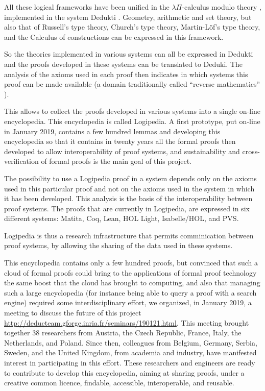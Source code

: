 All these logical frameworks have been unified in the $\lambda
\Pi$-calculus modulo theory \cite{CousineauDowek07}, implemented in
the system {\sc Dedukti} \cite{Assaf16}.  Geometry, arithmetic and set
theory, but also that of Russell's type theory, Church's type theory,
Martin-L\"of's type theory, and the Calculus of constructions can be
expressed in this framework.

So the theories implemented in various systems can all be expressed in
{\sc Dedukti} and the proofs developed in these systems can be
translated to {\sc Deduki}.  The analysis of the axioms used in each
proof then indicates in which systems this proof can be made available
\cite{Thire18,Dowek17} (a domain traditionally called ``reverse
mathematics'' \cite{Friedman76,Simpson09}).

This allows to collect the proofs developed in various systems into a
single on-line encyclopedia.  This encyclopedia is called {\sc
  Logipedia}. A first prototype, put on-line in January 2019, contains
a few hundred lemmas and developing this encyclopedia so that it
contains in twenty years all the formal proofs then developed to allow
interoperability of proof systems, and sustainability and
cross-verification of formal proofs is the main goal of this project.

The possibility to use a {\sc Logipedia} proof in a system depends
only on the axioms used in this particular proof and not on the axioms
used in the system in which it has been developed. This analysis is
the basis of the interoperability between proof systems.  The proofs
that are currently in {\sc Logipedia}, are expressed in six different
systems: {\sc Matita}, {\sc Coq}, {\sc Lean}, {\sc HOL Light}, {\sc
  Isabelle/HOL}, and {\sc PVS}.

{\sc Logipedia} is thus a research infrastructure that permits
comminication between proof systems, by allowing the sharing of the
data used in these systems.


This encyclopedia contains only a few hundred proofs, but convinced
that such a cloud of formal proofs could bring to the applications of
formal proof technology the same boost that the cloud has brought to
computing, and also that managing such a large encyclopedia (for
instance being able to query a proof with a search engine) required
some interdisciplinary effort, we organized, in January 2019, a
meeting to discuss the future of this project
\url{http://deducteam.gforge.inria.fr/seminars/190121.html}.  This
meeting brought together 38 researchers from Austria, the Czech
Republic, France, Italy, the Netherlands, and Poland.  Since then,
colleagues from Belgium, Germany, Serbia, Sweden, and the United
Kingdom, from academia and industry, have manifested interest in
participating in this effort.  These researchers and engineers are
ready to contribute to develop this encyclopedia, aiming at sharing
proofs, under a creative common licence, findable, accessible,
interoperable, and reusable.

